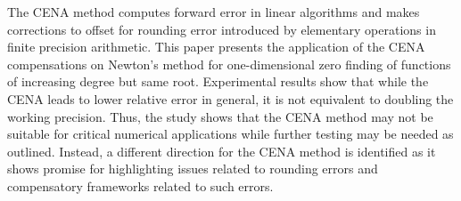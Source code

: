 \documentclass{standalone}
\begin{document}
	The CENA method computes forward error in linear algorithms and makes corrections to offset for rounding error introduced by elementary operations in finite precision arithmetic. This paper presents the application of the CENA compensations on Newton's method for one-dimensional zero finding of functions of increasing degree but same root. Experimental results show that while the CENA leads to lower relative error in general, it is not equivalent to doubling the working precision. Thus, the study shows that the CENA method may not be suitable for critical numerical applications while further testing may be needed as outlined. Instead, a different direction for the CENA method is identified as it shows promise for highlighting issues related to rounding errors and compensatory frameworks related to such errors.
\end{document}

